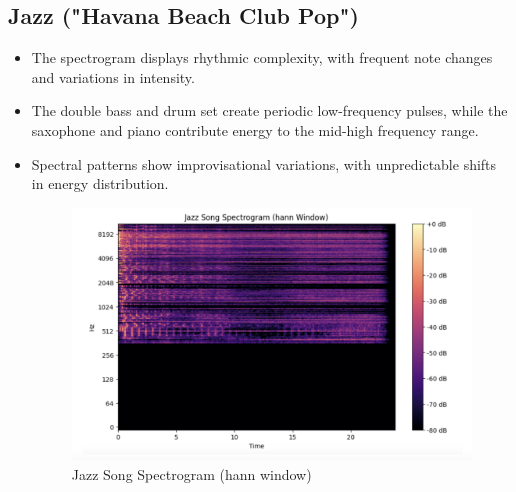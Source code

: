 \documentclass[a4paper,12pt]{article}
\begin{document}
\subsection{Jazz ("Havana Beach Club Pop")}
\begin{itemize}
\item The spectrogram displays rhythmic complexity, with frequent note changes and variations in intensity.
\item The double bass and drum set create periodic low-frequency pulses, while the saxophone and piano contribute energy to the mid-high frequency range.
\item Spectral patterns show improvisational variations, with unpredictable shifts in energy distribution.
\begin{figure}[H]
    \centering
    \includegraphics[width=1\linewidth]{JazzSongSPGM.png}
    \caption{Jazz Song Spectrogram (hann window)}
    \label{fig:enter-label}
\end{figure}
\end{itemize}
\newpage
\end{document}
